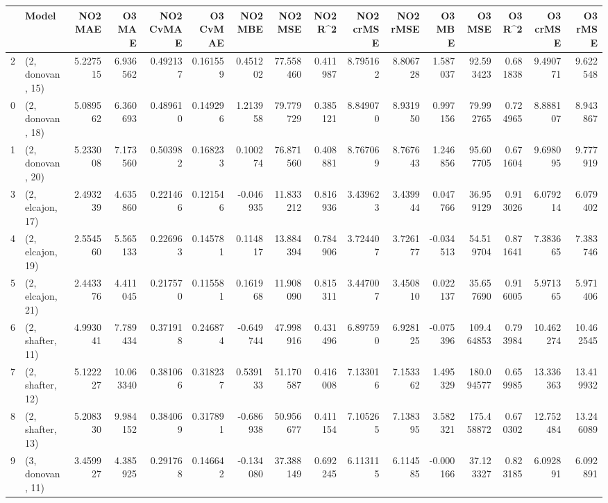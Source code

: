 \begin{tabular}{llrrrrrrrrrrrrrr}
\toprule
{} &             Model &   NO2 MAE &     O3 MAE &  NO2 CvMAE &  O3 CvMAE &   NO2 MBE &    NO2 MSE &   NO2 R\textasciicircum2 &  NO2 crMSE &  NO2 rMSE &    O3 MBE &      O3 MSE &    O3 R\textasciicircum2 &   O3 crMSE &    O3 rMSE \\
\midrule
2  &  (2, donovan, 15) &  5.227515 &   6.936562 &   0.492137 &  0.161559 &  0.451202 &  77.558460 &  0.411987 &   8.795162 &  8.806728 &  1.587037 &   92.593423 &  0.681838 &   9.490771 &   9.622548 \\
0  &  (2, donovan, 18) &  5.089562 &   6.360693 &   0.489610 &  0.149296 &  1.213958 &  79.779729 &  0.385121 &   8.849070 &  8.931950 &  0.997156 &   79.992765 &  0.724965 &   8.888107 &   8.943867 \\
1  &  (2, donovan, 20) &  5.233008 &   7.173560 &   0.503982 &  0.168233 &  0.100274 &  76.871560 &  0.408881 &   8.767069 &  8.767643 &  1.246856 &   95.607705 &  0.671604 &   9.698095 &   9.777919 \\
3  &  (2, elcajon, 17) &  2.493239 &   4.635860 &   0.221466 &  0.121546 & -0.046935 &  11.833212 &  0.816936 &   3.439623 &  3.439944 &  0.047766 &   36.959129 &  0.913026 &   6.079214 &   6.079402 \\
4  &  (2, elcajon, 19) &  2.554560 &   5.565133 &   0.226963 &  0.145781 &  0.114817 &  13.884394 &  0.784906 &   3.724407 &  3.726177 & -0.034513 &   54.519704 &  0.871641 &   7.383665 &   7.383746 \\
5  &  (2, elcajon, 21) &  2.443376 &   4.411045 &   0.217570 &  0.115581 &  0.161968 &  11.908090 &  0.815311 &   3.447007 &  3.450810 &  0.022137 &   35.657690 &  0.916005 &   5.971365 &   5.971406 \\
6  &  (2, shafter, 11) &  4.993041 &   7.789434 &   0.371918 &  0.246874 & -0.649744 &  47.998916 &  0.431496 &   6.897590 &  6.928125 & -0.075396 &  109.464853 &  0.793984 &  10.462274 &  10.462545 \\
7  &  (2, shafter, 12) &  5.122227 &  10.063340 &   0.381066 &  0.318237 &  0.539133 &  51.170587 &  0.416008 &   7.133016 &  7.153362 &  1.495329 &  180.094577 &  0.659985 &  13.336363 &  13.419932 \\
8  &  (2, shafter, 13) &  5.208330 &   9.984152 &   0.384069 &  0.317891 & -0.686938 &  50.956677 &  0.411154 &   7.105265 &  7.138395 &  3.582321 &  175.458872 &  0.670302 &  12.752484 &  13.246089 \\
9  &  (3, donovan, 11) &  3.459927 &   4.385925 &   0.291768 &  0.146642 & -0.134080 &  37.388149 &  0.692245 &   6.113115 &  6.114585 & -0.000166 &   37.123327 &  0.823185 &   6.092891 &   6.092891 \\

\end{tabular}
